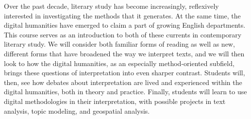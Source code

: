 Over the past decade, literary study has become increasingly, reflexively
interested in investigating the methods that it generates.  At the same time,
the digital humanities have emerged to claim a part of growing English
departments. This course serves as an introduction to both of these currents in
contemporary literary study. We will consider both familiar forms of reading as
well as new, different forms that have broadened the way we interpret texts,
and we will then look to how the digital humanities, as an especially
method-oriented subfield, brings these questions of interpretation into even
sharper contrast. Students will, then, see how debates about interpretation are
lived and experienced within the digital humanities, both in theory and
practice. Finally, students will learn to use digital methodologies in their
interpretation, with possible projects in text analysis, topic modeling, and
geospatial analysis.

